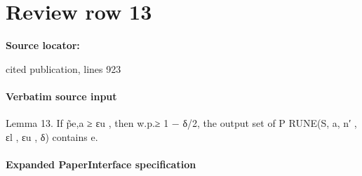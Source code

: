 \documentclass[10pt]{article}
\begin{document}
\section*{Review row 13}
\textbf{Source locator:} {\footnotesize\raggedright cited publication, lines 923\par}
\paragraph{Verbatim source input}
\begin{ReviewVerbatim}
Lemma 13. If p̃e,a ≥ εu , then w.p.≥ 1 − δ/2, the output set of P RUNE(S, a, n′ , εl , εu , δ) contains e.
\end{ReviewVerbatim}



\paragraph{Expanded PaperInterface specification}
\end{document}
